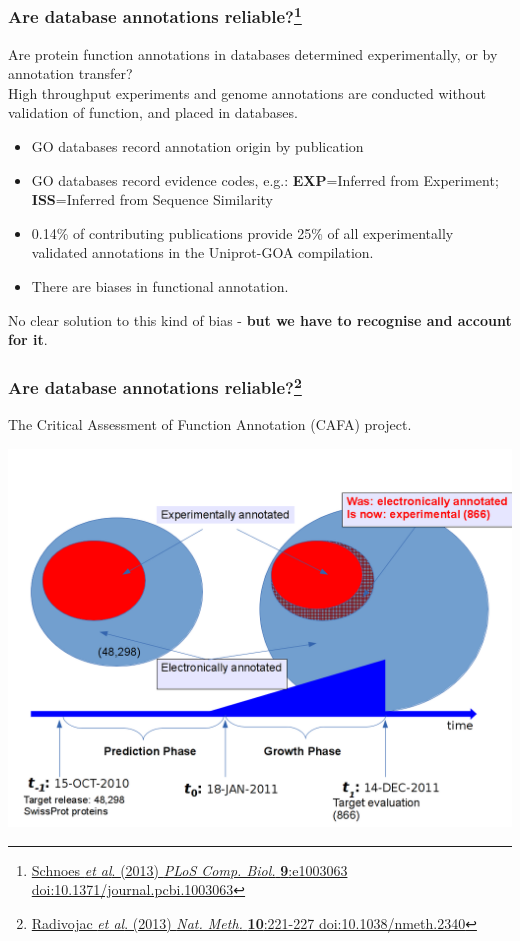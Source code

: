 \begin{frame}
  \frametitle{Are database annotations reliable?\footnote{\tiny{\href{http://dx.doi.org/10.1371/journal.pcbi.1003063}{Schnoes \textit{et al}. (2013) \textit{PLoS Comp. Biol.} \textbf{9}:e1003063 doi:10.1371/journal.pcbi.1003063}}}}
  Are protein function annotations in databases determined experimentally, or by annotation transfer?\\[0.1cm]
  High throughput experiments and genome annotations are conducted without validation of function, and placed in databases.\\[0.1cm]
  \begin{itemize}
    \item GO databases record annotation origin by publication 
    \item GO databases record evidence codes, e.g.: \textbf{EXP}=Inferred from Experiment; \textbf{ISS}=Inferred from Sequence Similarity
    \item 0.14\% of contributing publications provide 25\% of all experimentally validated annotations in the Uniprot-GOA compilation.
    \item There are biases in functional annotation.
  \end{itemize}
  No clear solution to this kind of bias - \textbf{but we have to recognise and account for it}.
\end{frame}

\begin{frame}
  \frametitle{Are database annotations reliable?\footnote{\tiny{\href{http://dx.doi.org/10.1038/nmeth.2340}{Radivojac \textit{et al}. (2013) \textit{Nat. Meth.} \textbf{10}:221-227 doi:10.1038/nmeth.2340}}}}
  The Critical Assessment of Function Annotation (CAFA) project.
  \begin{center}
    \includegraphics[height=0.7\textheight]{images/cafa_annotation_problem}
  \end{center}   
\end{frame}

